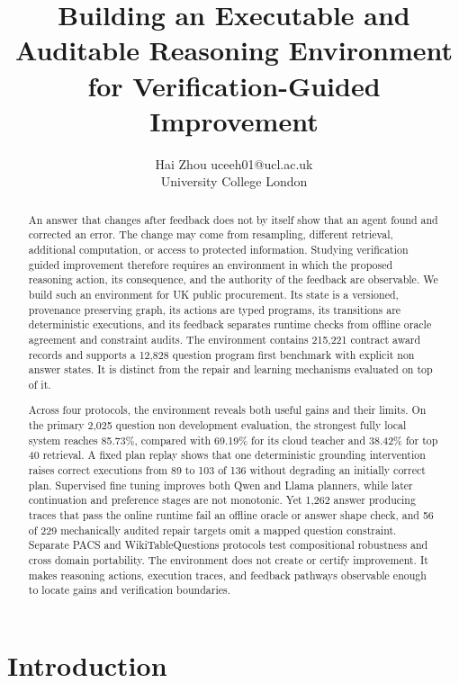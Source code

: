 \documentclass{article}
\title{Building an Executable and Auditable Reasoning Environment for Verification-Guided Improvement}
\author{\name Hai Zhou \email uceeh01@ucl.ac.uk \\
 \addr University College London}
\begin{document}
\maketitle

\begin{abstract}
An answer that changes after feedback does not by itself show that an agent found and corrected an
error.  The change may come from resampling, different retrieval, additional computation, or access
to protected information.  Studying verification guided improvement therefore requires an
environment in which the proposed reasoning action, its consequence, and the authority of the
feedback are observable.  We build such an environment for UK public procurement.  Its state is a
versioned, provenance preserving graph, its actions are typed programs, its transitions are
deterministic executions, and its feedback separates runtime checks from offline oracle agreement
and constraint audits.  The environment contains 215,221 contract award records and supports a
12,828 question program first benchmark with explicit non answer states.  It is distinct from the
repair and learning mechanisms evaluated on top of it.

Across four protocols, the environment reveals both useful gains and their limits.  On the primary
2,025 question non development evaluation, the strongest fully local system reaches 85.73\%,
compared with 69.19\% for its cloud teacher and 38.42\% for top 40 retrieval.  A fixed plan replay
shows that one deterministic grounding intervention raises correct executions from 89 to 103 of
136 without degrading an initially correct plan.  Supervised fine tuning improves both Qwen and
Llama planners, while later continuation and preference stages are not monotonic.  Yet 1,262
answer producing traces that pass the online runtime fail an offline oracle or answer shape check,
and 56 of 229 mechanically audited repair targets omit a mapped question constraint.  Separate
PACS and WikiTableQuestions protocols test compositional robustness and cross domain portability.
The environment does not create or certify improvement.  It makes reasoning actions, execution
traces, and feedback pathways observable enough to locate gains and verification boundaries.
\end{abstract}

\section{Introduction}
\label{sec:introduction}
\end{document}
